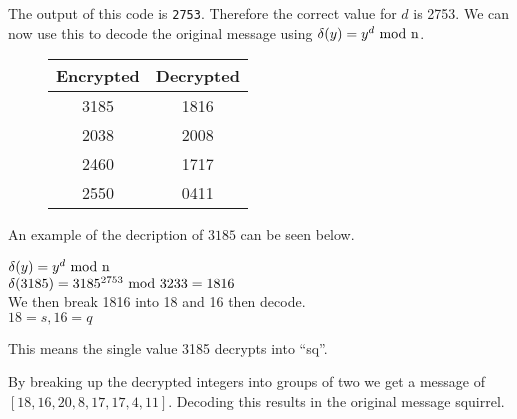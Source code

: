 The output of this code is \texttt{2753}. Therefore the correct value for $d$ is 2753. We can now use this to decode the original message using $\delta(y) = y^d \rm{~mod~} n$.

\begin{figure}[H]
\centering
\begin{tabular}{|c|c|}
\hline
Encrypted & Decrypted\\
\hline
3185 & 1816 \\
2038 & 2008 \\
2460 & 1717 \\
2550 & 0411 \\
\hline
\end{tabular}
\end{figure}

An example of the decription of $3185$ can be seen below.
\begin{center}
    $\delta(y) = y^d \rm{~mod~} n$ \\
    $\delta(3185) = 3185^{2753} \rm{~mod~} 3233 = 1816$ \\
    We then break 1816 into 18 and 16 then decode. \\
    $18 = s, 16 = q$ \\
\end{center}

This means the single value 3185 decrypts into ``sq''.

By breaking up the decrypted integers into groups of two we get a message of $[18, 16, 20, 8, 17, 17, 4, 11]$. Decoding this results in the original message squirrel.